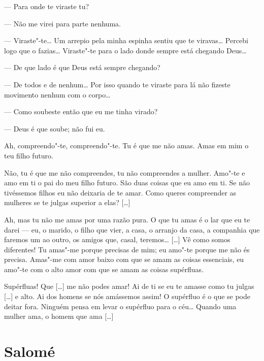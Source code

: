 \endgroup

\asterisc

\begingroup
\linenumbers

\forceindent{}--- Para onde te viraste tu?

--- Não me virei para parte nenhuma.

--- Viraste"-te\ldots{} Um arrepio pela minha espinha sentiu que te viravas\ldots{}
Percebi logo que o fazias\ldots{} Viraste"-te para o lado donde sempre está
chegando Deus\ldots{}

--- De que lado é que Deus está sempre chegando?

--- De todos e de nenhum\ldots{} Por isso quando te viraste para lá não
fizeste movimento nenhum com o corpo\ldots{}

--- Como soubeste então que eu me tinha virado?

--- Deus é que soube; não fui eu.

\asterisc

 Ah, compreendo"-te, compreendo"-te. Tu é que me não amas. Amas em mim
o teu filho futuro.

 Não, tu é que me não compreendes, tu não compreendes a mulher.
Amo"-te e amo em ti o pai do meu filho futuro. São duas coisas que eu
amo em ti. Se não tivéssemos filhos eu não deixaria de te amar. Como
queres compreender as mulheres se te julgas superior a elas? [\ldots{}]

 Ah, mas tu não me amas por uma razão pura. O que tu amas é o lar
que eu te darei --- eu, o marido, o filho que vier, a casa, o arranjo
da casa, a companhia que faremos um ao outro, os amigos que, casal,
teremos\ldots{} [\ldots{}] Vê como somos diferentes! Tu amas"-me porque precisas
de mim; eu amo"-te porque me não és precisa. Amas"-me com amor baixo
com que se amam as coisas essenciais, eu amo"-te com o alto amor com
que se amam as coisas supérfluas.

 Supérfluas! Que [\ldots{}] me não podes amar! Ai de ti se eu te amasse
como tu julgas [\ldots{}] e alto. Ai dos homens se nós amássemos assim! O
supérfluo é o que se pode deitar fora. Ninguém pensa em levar o
supérfluo para o céu\ldots{} Quando uma mulher ama, o homem que ama [\ldots{}]

\endgroup

\chapter{Salomé}

\begingroup
\linenumbers

